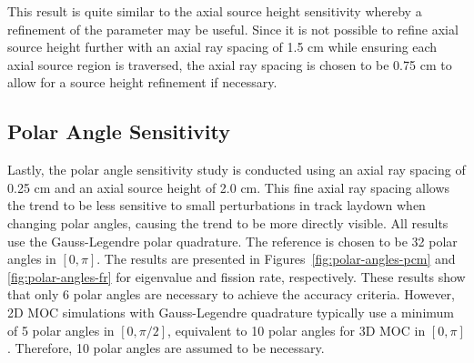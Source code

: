 This result is quite similar to the axial source height sensitivity whereby a refinement of the parameter may be useful. Since it is not possible to refine axial source height further with an axial ray spacing of 1.5 cm while ensuring each axial source region is traversed, the axial ray spacing is chosen to be 0.75 cm to allow for a source height refinement if necessary.

\subsection{Polar Angle Sensitivity}
\label{sec:polar-angle-sensitivity}

Lastly, the polar angle sensitivity study is conducted using an axial ray spacing of 0.25 cm and an axial source height of 2.0 cm. This fine axial ray spacing allows the trend to be less sensitive to small perturbations in track laydown when changing polar angles, causing the trend to be more directly visible. All results use the Gauss-Legendre polar quadrature. The reference is chosen to be 32 polar angles in $[0, \pi]$. The results are presented in Figures~\ref{fig:polar-angles-pcm} and \ref{fig:polar-angles-fr} for eigenvalue and fission rate, respectively. These results show that only 6 polar angles are necessary to achieve the accuracy criteria. However, 2D \ac{MOC} simulations with Gauss-Legendre quadrature typically use a minimum of 5 polar angles in $[0,\pi/2]$, equivalent to 10 polar angles for 3D \ac{MOC} in $[0,\pi]$. Therefore, 10 polar angles are assumed to be necessary.

